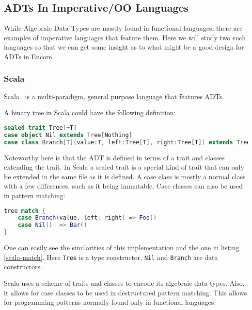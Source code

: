 \documentclass[10pt]{report}
\def\code#1{\texttt{#1}} %
\begin{document}
\subsection{ADTs In Imperative/OO Languages}
\par{While Algebraic Data Types are mostly found in functional languages, there are examples of imperative languages that feature them. Here we will study two such languages so that we can get some insight as to what might be a good design for ADTs in Encore.}
\subsubsection{Scala}
\par{Scala~\cite{scala-overview-tech-report} is a multi-paradigm, general purpose language that features ADTs.}
\par{A binary tree in Scala could have the following definition:}

\begin{lstlisting}[language=Scala,caption={ADT definition in Scala}]
sealed trait Tree[+T]
case object Nil extends Tree[Nothing]
case class Branch[T](value:T, left:Tree[T], right:Tree[T]) extends Tree[T]
\end{lstlisting}
\par{Noteworthy here is that the ADT is defined in terms of a trait and classes extending the trait. In Scala a sealed trait is a special kind of trait that can only be extended in the same file as it is defined. A case class is mostly a normal class with a few differences, such as it being immutable. Case classes can also be used in pattern matching:}
\begin{lstlisting}[language=Scala,caption={Pattern matching on an ADT in Scala},label=scala-match]
tree match {
    case Branch(value, left, right) => Foo()
    case Nil()  => Bar()
}
\end{lstlisting}
\par{One can easily see the similarities of this implementation and the one in listing \ref{scala-match}. Here \code{Tree} is a type constructor, \code{Nil} and \code{Branch} are data constructors.}
\par{Scala uses a scheme of traits and classes to encode its algebraic data types. Also, it allows for case classes to be used in destructured pattern matching. This allows for programming patterns normally found only in functional languages.}
\end{document}
